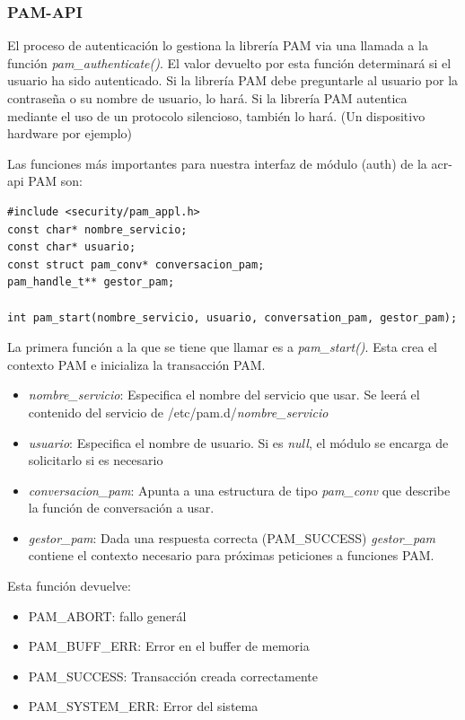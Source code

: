 \documentclass[titlepage, 12pt, a4paper]{article}
\begin{document}
\subsubsection{PAM-API}
El proceso de autenticación lo gestiona la librería PAM via una llamada a la función \textit{pam\_authenticate()}. El valor devuelto por esta función determinará si el usuario ha sido autenticado. Si la librería PAM debe preguntarle al usuario por la contraseña o su nombre de usuario, lo hará. Si la librería PAM autentica mediante el uso de un protocolo silencioso, también lo hará. (Un dispositivo hardware por ejemplo)\cite{linux-pam-application} \par
Las funciones más importantes para nuestra interfaz de módulo (auth) de la \gls{acr-api} PAM son:
\begin{lstlisting}
#include <security/pam_appl.h>
const char* nombre_servicio;
const char* usuario;
const struct pam_conv* conversacion_pam;
pam_handle_t** gestor_pam;

int pam_start(nombre_servicio, usuario, conversation_pam, gestor_pam);
\end{lstlisting}
La primera función a la que se tiene que llamar es a \textit{pam\_start()}. Esta crea el contexto PAM e inicializa la transacción PAM.\par
\begin{itemize}
	\item{\textit{nombre\_servicio}: Especifica el nombre del servicio que usar. Se leerá el contenido del servicio de /etc/pam.d/\textit{nombre\_servicio}}
	\item{\textit{usuario}: Especifica el nombre de usuario. Si es \textit{null}, el módulo se encarga de solicitarlo si es necesario}
	\item{\textit{conversacion\_pam}: Apunta a una estructura de tipo \textit{pam\_conv} que describe la función de conversación a usar.}
	\item{\textit{gestor\_pam}: Dada una respuesta correcta (PAM\_SUCCESS) \textit{gestor\_pam} contiene el contexto necesario para próximas peticiones a funciones PAM.}
\end{itemize} 
Esta función devuelve:
\begin{itemize}
	\item{PAM\_ABORT: fallo generál}
	\item{PAM\_BUFF\_ERR: Error en el buffer de memoria}
	\item{PAM\_SUCCESS: Transacción creada correctamente}
	\item{PAM\_SYSTEM\_ERR: Error del sistema}
\end{itemize} \par
\end{document}
